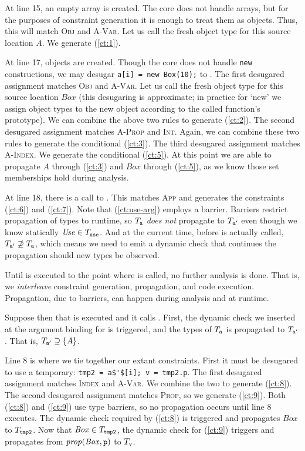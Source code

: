 At line 15, an empty array is created. The core does not handle arrays, but
for the purposes of constraint generation it is enough to treat them as
objects. Thus, this will match \textsc{Obj} and \textsc{A-Var}. Let us call
the fresh object type for this source location $A$. We generate (\ref{ct:1}).

At line 17,  objects are created. Though the core does not handle
\lstinline{new} constructions, we may desugar
\lstinline{a[i] = new Box(10);} to . The first desugared assignment matches \textsc{Obj} and
\textsc{A-Var}. Let us call the fresh object type for this source location
$\mathit{Box}$ (this desugaring is approximate; in practice for `new' we assign
object types to the new object according to the called function's prototype).
We can combine the above two rules to generate (\ref{ct:2}).
The second desugared assignment matches \textsc{A-Prop} and
\textsc{Int}. Again, we can combine these two rules to generate the
conditional (\ref{ct:3}).  The third desugared assignment matches
\textsc{A-Index}. We generate the conditional (\ref{ct:5}). At this point we are able to propagate $\mathit{A}$ through (\ref{ct:3}) and $\mathit{Box}$ through (\ref{ct:5}), as we know those set memberships hold during analysis.

At line 18, there is a call to . This matches \textsc{App} and
generates the constraints (\ref{ct:6}) and (\ref{ct:7}). Note that
(\ref{ct:use-arg}) employs a barrier. Barriers restrict propagation
of types to runtime, so $T_{\texttt{a}}$ \emph{does not} propagate to
$T_{\texttt{a}'}$ even though we know statically $\mathit{Use} \in
T_{\texttt{use}}$. And at the current time, before  is actually
called, $T_{\texttt{a}'} \not\supseteq T_{\texttt{a}}$, which means we need to
emit a dynamic check that continues the propagation should new types be
observed.

Until  is executed to the point where  is called, no
further analysis is done. That is, we \emph{interleave} constraint generation,
propagation, and code execution. Propagation, due to barriers, can happen
during analysis and at runtime.

Suppose then that  is executed and it calls . First,
the dynamic check we inserted at the argument binding for  is
triggered, and the types of $T_{\texttt{a}}$ is propagated to
$T_{\texttt{a}'}$. That is, $T_{\texttt{a}'} \supseteq \{A\}$.

Line 8 is where we tie together our extant constraints. First it must be
desugared to use a temporary: \lstinline{tmp2 = a$'$[i]; v = tmp2.p}. The
first desugared assignment matches \textsc{Index} and \textsc{A-Var}. We
combine the two to generate (\ref{ct:8}). The second desugared assignment
matches \textsc{Prop}, so we generate (\ref{ct:9}). Both
(\ref{ct:8}) and (\ref{ct:9}) use type barriers, so no propagation occurs
until line 8 executes.
The dynamic check required by (\ref{ct:8}) is triggered and propagates
$\mathit{Box}$ to $T_{\texttt{tmp2}}$. Now that $\mathit{Box} \in
T_{\texttt{tmp2}}$, the dynamic check for (\ref{ct:9}) triggers and propagates
 from $\mathit{prop}(\mathit{Box}, \texttt{p})$ to $T_{\texttt{v}}$.

